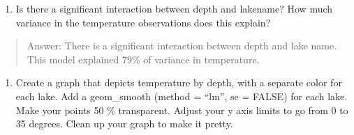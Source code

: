 \documentclass[]{article}
\newenvironment{Shaded}{\begin{snugshade}}{\end{snugshade}}
\newcommand{\CommentTok}[1]{\textcolor[rgb]{0.56,0.35,0.01}{\textit{#1}}}
\newcommand{\DataTypeTok}[1]{\textcolor[rgb]{0.13,0.29,0.53}{#1}}
\newcommand{\DecValTok}[1]{\textcolor[rgb]{0.00,0.00,0.81}{#1}}
\newcommand{\FloatTok}[1]{\textcolor[rgb]{0.00,0.00,0.81}{#1}}
\newcommand{\KeywordTok}[1]{\textcolor[rgb]{0.13,0.29,0.53}{\textbf{#1}}}
\newcommand{\NormalTok}[1]{#1}
\newcommand{\OperatorTok}[1]{\textcolor[rgb]{0.81,0.36,0.00}{\textbf{#1}}}
\newcommand{\OtherTok}[1]{\textcolor[rgb]{0.56,0.35,0.01}{#1}}
\newcommand{\StringTok}[1]{\textcolor[rgb]{0.31,0.60,0.02}{#1}}
\providecommand{\tightlist}{%
  \setlength{\itemsep}{0pt}\setlength{\parskip}{0pt}}
\begin{document}
\begin{enumerate}
\def\labelenumi{\arabic{enumi}.}
\setcounter{enumi}{6}
\tightlist
\item
  Is there a significant interaction between depth and lakename? How
  much variance in the temperature observations does this explain?
\end{enumerate}

\begin{quote}
Answer: There is a significant interaction between depth and lake name.
This model explained 79\% of variance in temperature.
\end{quote}

\begin{enumerate}
\def\labelenumi{\arabic{enumi}.}
\setcounter{enumi}{7}
\tightlist
\item
  Create a graph that depicts temperature by depth, with a separate
  color for each lake. Add a geom\_smooth (method = ``lm'', se = FALSE)
  for each lake. Make your points 50 \% transparent. Adjust your y axis
  limits to go from 0 to 35 degrees. Clean up your graph to make it
  pretty.
\end{enumerate}

\begin{Shaded}
\end{Shaded}
\end{document}
